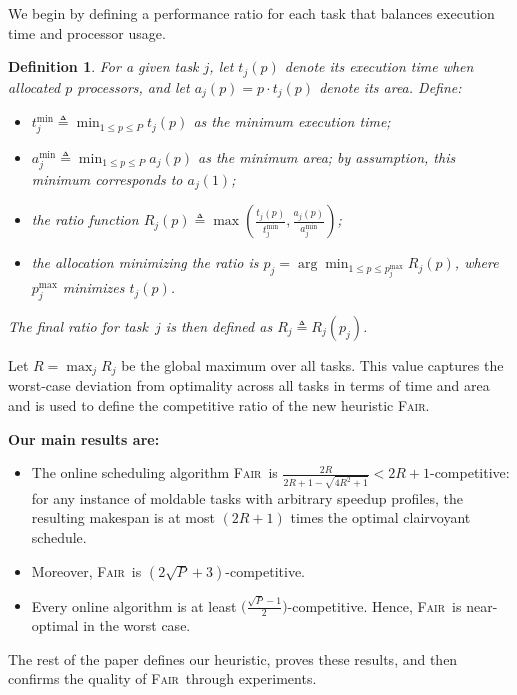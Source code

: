 \documentclass{article}
\newtheorem{definition}{Definition}
\newcommand\fair{\textsc{Fair}\xspace}
\newcommand\ratio{R\xspace}
\begin{document}
We begin by defining a performance ratio for each task that balances execution time and processor usage.

\begin{definition}
\label{def.ratio}
For a given task $j$, let $t_j(p)$ denote its execution time when allocated $p$ processors, and let $a_j(p)=p \cdot t_j(p)$ denote its area. Define:
\begin{itemize}
    \item $t_j^{\min} \triangleq \min_{1 \le p \le P} t_j(p)$ as the minimum execution time;
    \item $a_j^{\min} \triangleq \min_{1 \le p \le P} a_j(p)$ as the minimum area; by assumption, this minimum corresponds to $a_j(1)$;
    \item the ratio function $\ratio_j(p) \triangleq \max\!\left(\frac{t_j(p)}{t_j^{\min}}, \frac{a_j(p)}{a_j^{\min}}\right)$;
    \item the allocation minimizing the ratio is $p_j \!=\! \arg\min_{1 \le p \le p_j^{\max}} \ratio_j(p)$, where $p_j^{\max}$ minimizes $t_j(p)$.
\end{itemize}
The final ratio for task~$j$ is then defined as $\ratio_j \triangleq \ratio_j(p_j)$.
\end{definition}

Let $\ratio = \max_j \ratio_j$ be the global maximum over all tasks. This value captures the worst-case deviation from optimality across all tasks in terms of time and area and is used to define the competitive ratio of the new heuristic \fair.

\textbf{Our main results are:}
\begin{itemize}
    \item The online scheduling algorithm \fair\ is $\frac{2\ratio}{2\ratio+1-\sqrt{4\ratio^2+1}}< 2\ratio+1$-competitive: for any instance of moldable tasks with arbitrary speedup profiles, the resulting makespan is at most $(2\ratio+1)$ times the optimal clairvoyant schedule.
    \item Moreover, \fair\ is $(2\sqrt{P}+3)$-competitive.
    \item Every online algorithm is at least $\bigl(\tfrac{\sqrt{P}-1}{2}\bigr)$-competitive. Hence, \fair\ is near-optimal in the worst case.
\end{itemize}

The rest of the paper defines our heuristic, proves these results, and then confirms the quality of \fair\ through experiments.
\end{document}
